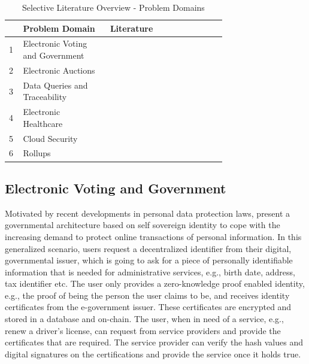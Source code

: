 \setlength{\tabcolsep}{2ex}
\renewcommand{\arraystretch}{1.5}%
\begin{table}[ht]
	\centering
	    \caption{Selective Literature Overview - Problem Domains}
		\begin{tabular}{| m{0.02\linewidth} | m{0.3\linewidth} | m{0.4\linewidth} |}
		\hline
		\textbf{} & \textbf{Problem Domain} & \textbf{Literature} \\ \hline
            1 & Electronic Voting and \newline Government & \citet{Bansod, Guo, Querejeta} \\  \hline
            2 & Electronic Auctions & \citet{LiXue, WangZhaoMu} \\ \hline 
            3 & Data Queries and \newline Traceability & \citet{Godden, XueWang}  \\  \hline
            4 & Electronic Healthcare & \citet{LuongPark, ZHENG, WangEtAl, Huangetal} \\  \hline 
            5 & Cloud Security & \citet{LiuWangPengXing, Major, Munivel, Kanagamani} \\  \hline 
            6 & Rollups & \citet{chen2022review, scalingintro, zksyncintro, buterinrollups} \\  \hline 
	\end{tabular}
\label{tab:domains}
\end{table}

\subsection{Electronic Voting and Government}
Motivated by recent developments in personal data protection laws, \citet{Bansod} present a governmental architecture based on self sovereign identity to cope with the increasing demand to protect online transactions of personal information. In this generalized scenario, users request a decentralized identifier from their digital, governmental issuer, which is going to ask for a piece of personally identifiable information that is needed for administrative services, e.g., birth date, address, tax identifier etc. The user only provides a zero-knowledge proof enabled identity, e.g., the proof of being the person the user claims to be, and receives identity certificates from the e-government issuer. These certificates are encrypted and stored in a database and on-chain. The user, when in need of a service, e.g., renew a driver's license, can request from service providers and provide the certificates that are required. The service provider can verify the hash values and digital signatures on the certifications and provide the service once it holds true.

